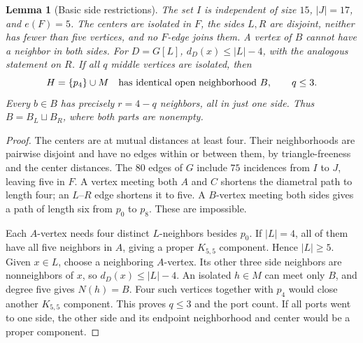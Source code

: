 \documentclass[11pt]{article}
\newtheorem{lemma}[theorem]{Lemma}
\begin{document}
\begin{lemma}[Basic side restrictions]\label{basic}
The set $I$ is independent of size $15$, $|J|=17$, and $e(F)=5$.
The centers are isolated in $F$, the sides $L,R$ are disjoint, neither
has fewer than five vertices, and no $F$-edge joins them. A vertex of
$B$ cannot have a neighbor in both sides. For $D=G[L]$,
$d_D(x)\leq |L|-4$, with the analogous statement on $R$.
If all $q$ middle vertices are isolated, then
\[
 H=\{p_4\}\cup M\quad\hbox{has identical open neighborhood }B,
 \qquad q\leq3.
\]
Every $b\in B$ has precisely $r=4-q$ neighbors, all in just one
side. Thus $B=B_L\sqcup B_R$, where both parts are nonempty.
\end{lemma}
\begin{proof}
The centers are at mutual distances at least four. Their neighborhoods
are pairwise disjoint and have no edges within or between them, by
triangle-freeness and the center distances. The $80$ edges of $G$
include $75$ incidences from $I$ to $J$, leaving five in $F$.
A vertex meeting both $A$ and $C$ shortens the diametral path to
length four; an $L$--$R$ edge shortens it to five. A $B$-vertex
meeting both sides gives a path of length six from $p_0$ to $p_8$.
These are impossible.

Each $A$-vertex needs four distinct $L$-neighbors besides $p_0$.
If $|L|=4$, all of them have all five neighbors in $A$, giving a
proper $K_{5,5}$ component. Hence $|L|\geq5$. Given $x\in L$,
choose a neighboring $A$-vertex. Its other three side neighbors
are nonneighbors of $x$, so $d_D(x)\leq |L|-4$.
An isolated $h\in M$ can meet only $B$, and degree five gives
$N(h)=B$. Four such vertices together with $p_4$ would close another
$K_{5,5}$ component. This proves $q\leq3$ and the port count.
If all ports went to one side, the other side and its endpoint
neighborhood and center would be a proper component.
\end{proof}
\end{document}
